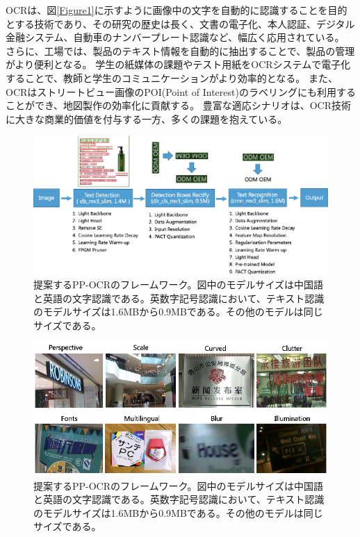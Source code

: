 \documentclass[uplatex, twocolumn,10pt]{jsarticle}
\begin{document}
OCRは、図\ref{Figure1}に示すように画像中の文字を自動的に認識することを目的とする技術であり、その研究の歴史は長く、文書の電子化、本人認証、デジタル金融システム、自動車のナンバープレート認識など、幅広く応用されている。
さらに、工場では、製品のテキスト情報を自動的に抽出することで、製品の管理がより便利となる。
学生の紙媒体の課題やテスト用紙をOCRシステムで電子化することで、教師と学生のコミュニケーションがより効率的となる。
また、OCRはストリートビュー画像のPOI(Point of Interest)のラベリングにも利用することができ、地図製作の効率化に貢献する。
豊富な適応シナリオは、OCR技術に大きな商業的価値を付与する一方、多くの課題を抱えている。

\begin{figure}[t]
    \begin{center}
        \includegraphics*{image/Figure2.png}
        \caption{提案するPP-OCRのフレームワーク。図中のモデルサイズは中国語と英語の文字認識である。英数字記号認識において、テキスト認識のモデルサイズは1.6MBから0.9MBである。その他のモデルは同じサイズである。}
        \label{Figure2}
    \end{center}
\end{figure}

\begin{figure}[t]
    \begin{center}
        \includegraphics*{image/Figure3.png}
        \caption{提案するPP-OCRのフレームワーク。図中のモデルサイズは中国語と英語の文字認識である。英数字記号認識において、テキスト認識のモデルサイズは1.6MBから0.9MBである。その他のモデルは同じサイズである。}
        \label{Figure2}
    \end{center}
\end{figure}
\end{document}
